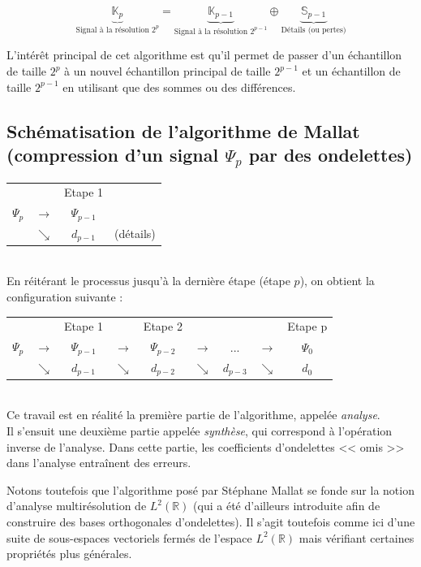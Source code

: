 \documentclass{article}
\begin{document}
$$ \underbrace{\mathbb{K}_p}_{\text{Signal à la résolution } 2^p}
= \underbrace{\mathbb{K}_{p-1}}_{\text{Signal à la résolution } 2^{p-1}} \oplus 
\underbrace{\mathbb{S}_{p-1}}_\text{Détails (ou pertes)} $$

L’intérêt principal de cet algorithme est qu’il permet de passer d’un échantillon de taille $2^p$ à un nouvel échantillon principal de taille $2^{p-1}$ et un échantillon de taille $2^{p-1}$ en utilisant que des sommes ou des différences.


\subsection{Schématisation de l'algorithme de Mallat (compression d'un signal $\Psi{}_{p}$ par des ondelettes)} 

\begin{tabular}{cccc}
           &             & Etape 1      & \\
$\Psi{}_{p}$ & $\rightarrow$ & $\Psi{}_{p-1}$ & \\
           & $\searrow$    & $d_{p-1}$      & (détails)
\end{tabular} \\

En réitérant le processus jusqu’à la dernière étape (étape $p$), on obtient la configuration suivante : \\


\begin{tabular}{ccccccccc}
           &             & Etape 1      & 			  & Etape 2     & & & & Etape p \\
$ \Psi{}_{p}$ & $ \rightarrow$ & $ \Psi{}_{p-1}$ & $ \rightarrow$ & $ \Psi{}_{p-2}$ & $ \rightarrow$ & ... & $ \rightarrow$ & $ \Psi{}_0$ \\
           & $ \searrow$    & $ d_{p-1} $      & $ \searrow$    & $ d_{p-2} $ 
& $ \searrow $ & $ d_{p-3 }$ & $ \searrow $ & $ d_0 $
\end{tabular} \\

Ce travail est en réalité la première partie de l’algorithme, appelée \textit{analyse}. \\

Il s’ensuit une deuxième partie appelée \textit{synthèse}, qui correspond à l’opération inverse de l’analyse. Dans cette partie, les coefficients d’ondelettes << omis >> dans l’analyse entraînent des erreurs.

Notons toutefois que l’algorithme posé par Stéphane Mallat se fonde sur la notion d’analyse multirésolution de $L^2 (\mathbb{R})$ (qui a été d’ailleurs introduite afin de construire des bases orthogonales d’ondelettes). Il s’agit toutefois comme ici d’une suite de sous-espaces vectoriels fermés de l’espace $L^2 (\mathbb{R})$ mais vérifiant certaines propriétés plus générales.
\end{document}
